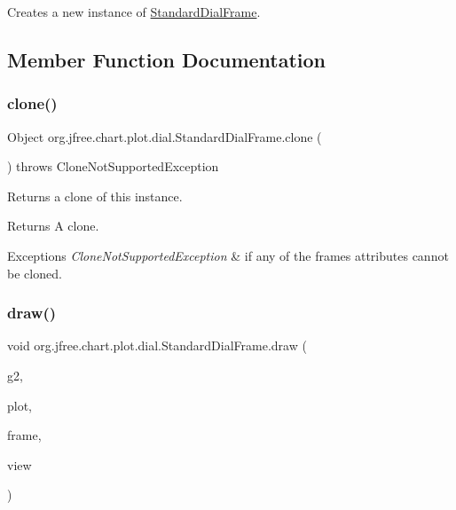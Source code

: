 Creates a new instance of {\ttfamily \mbox{\hyperlink{classorg_1_1jfree_1_1chart_1_1plot_1_1dial_1_1_standard_dial_frame}{Standard\+Dial\+Frame}}}. 

\subsection{Member Function Documentation}
\mbox{\label{classorg_1_1jfree_1_1chart_1_1plot_1_1dial_1_1_standard_dial_frame_ac16a8c59f505f44c9bdffcc9060a6e29}} 
\subsubsection{\texorpdfstring{clone()}{clone()}}
{\footnotesize\ttfamily Object org.\+jfree.\+chart.\+plot.\+dial.\+Standard\+Dial\+Frame.\+clone (\begin{DoxyParamCaption}{ }\end{DoxyParamCaption}) throws Clone\+Not\+Supported\+Exception}

Returns a clone of this instance.

\begin{DoxyReturn}{Returns}
A clone.
\end{DoxyReturn}

\begin{DoxyExceptions}{Exceptions}
{\em Clone\+Not\+Supported\+Exception} & if any of the frame\textquotesingle{}s attributes cannot be cloned. \\
\hline
\end{DoxyExceptions}
\mbox{\label{classorg_1_1jfree_1_1chart_1_1plot_1_1dial_1_1_standard_dial_frame_a16869a6511a52d288766710d40ce4e97}} 
\subsubsection{\texorpdfstring{draw()}{draw()}}
{\footnotesize\ttfamily void org.\+jfree.\+chart.\+plot.\+dial.\+Standard\+Dial\+Frame.\+draw (\begin{DoxyParamCaption}\item[{Graphics2D}]{g2,  }\item[{\mbox{\hyperlink{classorg_1_1jfree_1_1chart_1_1plot_1_1dial_1_1_dial_plot}{Dial\+Plot}}}]{plot,  }\item[{Rectangle2D}]{frame,  }\item[{Rectangle2D}]{view }\end{DoxyParamCaption})}

